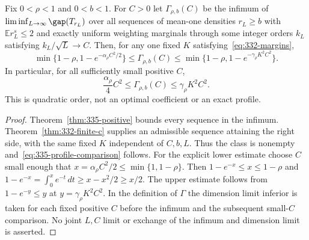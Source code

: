 \begin{corollary}
\label{cor:335-quadratic}
Fix $0<\rho<1$ and $0<b<1$. For $C>0$ let $\Gamma_{\rho,b}(C)$
be the infimum of $\liminf_{L\to\infty}\gap(T_{r_L})$ over all
sequences of mean-one densities $r_L\ge b$ with $\mathbb E r_L^s\le2$
and exactly uniform weighting marginals through some integer orders
$k_L$ satisfying $k_L/\sqrt L\to C$. Then, for any one fixed $K$
satisfying~\eqref{eq:332-margins},
\begin{equation}\label{eq:335-profile-comparison}
 \min\{1-\rho,1-e^{-\alpha_\rho C^2/2}\}
 \le\Gamma_{\rho,b}(C)
 \le\min\{1-\rho,1-e^{-\gamma_\rho K^2C^2}\}.
\end{equation}
In particular, for all sufficiently small positive $C$,
\[
 \frac{\alpha_\rho}{4}C^2
 \le\Gamma_{\rho,b}(C)\le\gamma_\rho K^2C^2.
\]
This is quadratic order, not an optimal coefficient or an exact profile.
\end{corollary}
\begin{proof}
Theorem~\ref{thm:335-positive} bounds every sequence in the infimum.
Theorem~\ref{thm:332-finite-c} supplies an admissible sequence attaining
the right side, with the same fixed $K$ independent of $C,b,L$.
Thus the class is nonempty and~\eqref{eq:335-profile-comparison} follows.
For the explicit lower estimate choose $C$ small enough that
$x=\alpha_\rho C^2/2\le\min\{1,1-\rho\}$. Then
$1-e^{-x}\le x\le1-\rho$ and
$1-e^{-x}=\int_0^x e^{-t}\,dt\ge x-x^2/2\ge x/2$.
The upper estimate follows from $1-e^{-y}\le y$ at
$y=\gamma_\rho K^2C^2$. In the definition of $\Gamma$ the dimension
limit inferior is taken for each fixed positive $C$ before the infimum
and the subsequent small-$C$ comparison. No joint $L,C$ limit or
exchange of the infimum and dimension limit is asserted.
\end{proof}

